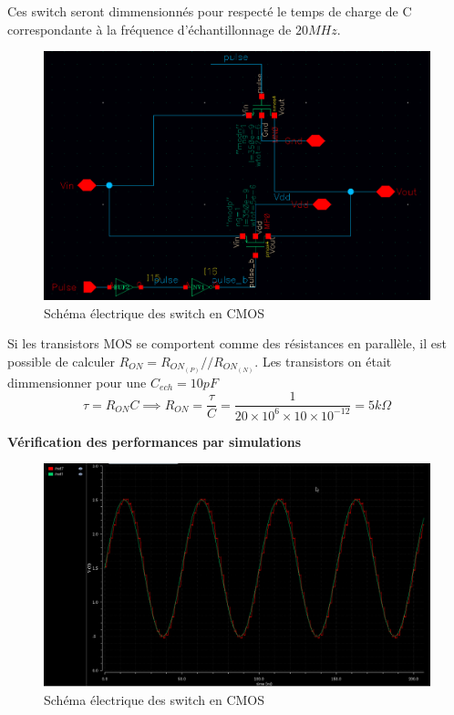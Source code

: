 \documentclass[11pt]{article}
\begin{document}
Ces switch seront dimmensionn\'es pour respect\'e le temps de charge de C
correspondante \`a la fr\'equence d'\'echantillonnage de $20 MHz$.

\begin{figure}[!htb]
\begin{center}
  \includegraphics[width=0.8\linewidth]{switchs_.png}
  \caption{Sch\'ema \'electrique des switch en CMOS}
\end{center}
\end{figure}

\clearpage

Si les transistors MOS se comportent comme des r\'esistances en parall\`ele,
il est possible de calculer $R_{ON} = R_{ON_{(P)}}//R_{ON_{(N)}}$.
Les transistors on \'etait dimmensionner pour une $C_{ech} = 10 pF$
\[
  \tau = R_{ON} C \implies R_{ON} = \frac{\tau}{C} = \frac{1}{20\times10^{6}\times10\times10^{-12}} = 5 k \Omega
\]



\clearpage

\textbf{V\'erification des performances par simulations}

\begin{figure}[!htb]
\begin{center}
  \includegraphics[width=0.8\linewidth]{switchs_simu.png}
  \caption{Sch\'ema \'electrique des switch en CMOS}
\end{center}
\end{figure}
\end{document}
